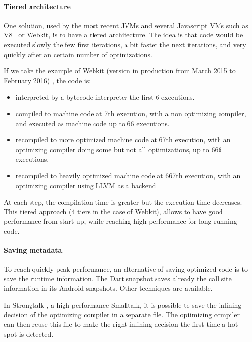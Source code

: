 \documentclass[a4paper,12pt,twoside]{../includes/ThesisStyle}
\begin{document}
\paragraph{Tiered architecture}
One solution, used by the most recent JVMs and several Javascript VMs such as V8~\cite{V8} or Webkit, is to have a tiered architecture. The idea is that code would be executed slowly the few first iterations, a bit faster the next iterations, and very quickly after an certain number of optimizations. 

If we take the example of Webkit (version in production from March 2015 to February 2016) \cite{Webkit15}, the code is:
\begin{itemize}
\item interpreted by a bytecode interpreter the first 6 executions.
\item compiled to machine code at 7th execution, with a non optimizing compiler, and executed as machine code up to 66 executions.
\item recompiled to more optimized machine code at 67th execution, with an optimizing compiler doing some but not all optimizations, up to 666 executions.
\item recompiled to heavily optimized machine code at 667th execution, with an optimizing compiler using LLVM as a backend.
\end{itemize}

At each step, the compilation time is greater but the execution time decreases. This tiered approach (4 tiers in the case of Webkit), allows to have good performance from start-up, while reaching high performance for long running code.

\paragraph{Saving metadata.}

To reach quickly peak performance, an alternative of saving optimized code is to save the runtime information. The Dart snapshot saves already the call site information in its Android snapshots. Other techniques are available.

In Strongtalk \cite{Sun06}, a high-performance Smalltalk, it is possible to save the inlining decision of the optimizing compiler in a separate file. The optimizing compiler can then reuse this file to make the right inlining decision the first time a hot spot is detected.
\end{document}
